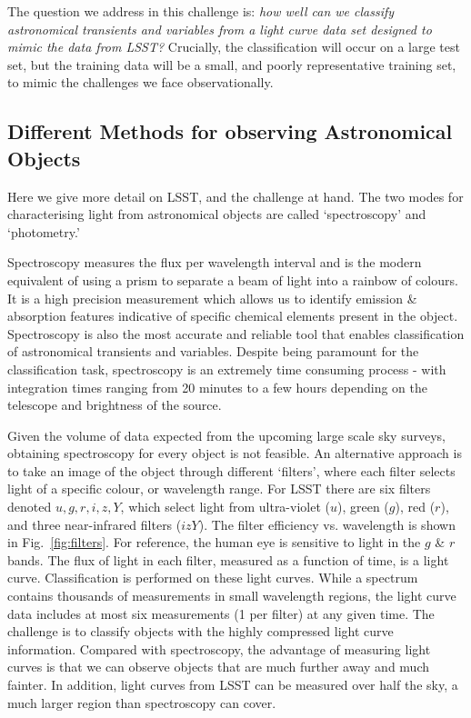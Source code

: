The question we address in this challenge is: \textit{how well can we classify astronomical transients and variables from a  light curve data set designed to mimic the data from LSST?} Crucially, the classification will occur on a large test set, but the training data will be a small, and poorly representative training set, to mimic the challenges we face observationally.

\subsection{Different Methods for observing Astronomical Objects}
\label{subsec:observmethods}
Here we give more detail on LSST, and the challenge at hand. The two modes for characterising light from astronomical objects are called `spectroscopy' and `photometry.'

Spectroscopy measures the flux per wavelength interval and is the modern equivalent of using a prism to separate a beam of light into a rainbow of colours. It is a high precision measurement which allows us to identify emission \& absorption features indicative of specific chemical elements present in the object.  Spectroscopy is also the most accurate and reliable tool that enables classification of astronomical transients and variables. Despite being paramount for the classification task, spectroscopy is an extremely time consuming process - with integration times ranging from 20 minutes to a few hours depending on the telescope and brightness of the source.

Given the volume of data expected from the upcoming large scale sky surveys, obtaining spectroscopy for every object is not feasible. An alternative approach is to take an image of the object through different `filters', where each filter selects light of a specific colour, or wavelength range. 
For LSST there are six filters denoted $u,g,r,i,z,Y$, which select light from 
ultra-violet ($u$), green ($g$), red ($r$), and three near-infrared filters ($izY$).
The filter efficiency vs. wavelength is shown in Fig.~\ref{fig:filters}.
For reference, the human eye is sensitive to light in the $g$ \& $r$ bands.
The flux of light in each filter, measured as a function of time, is a light curve.
Classification is performed on these light curves. 
While a spectrum contains thousands of measurements in small wavelength regions, 
the light curve data includes at most six measurements (1 per filter) at any given time. 
The challenge is to classify objects with the highly compressed light curve information. 
Compared with spectroscopy, the advantage of measuring light curves is that 
we can observe objects that are much further away and much fainter. In addition,
light curves from LSST can be measured over half the sky, a much larger region
than spectroscopy can cover.


